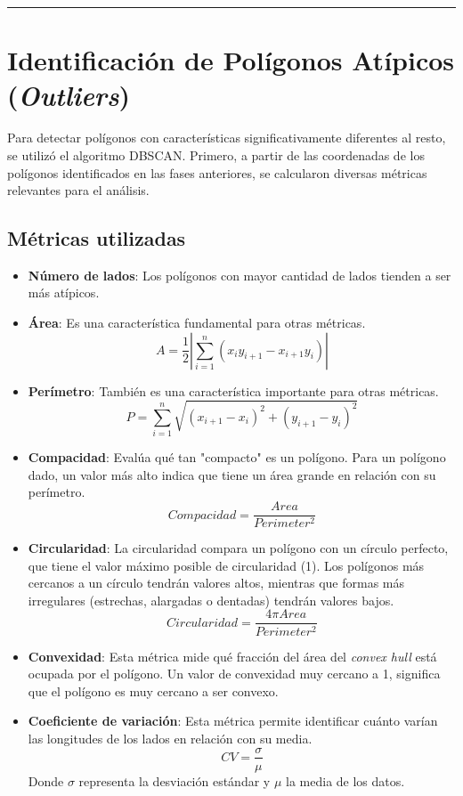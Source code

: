 \documentclass[twocolumn, fontsize=10pt]{article}
\begin{document}
\rule{\linewidth}{0.5pt}
\section{Identificación de Polígonos Atípicos (\textit{Outliers})}

Para detectar polígonos con características significativamente diferentes al resto, se utilizó el algoritmo DBSCAN. Primero, a partir de las coordenadas de los polígonos identificados en las fases anteriores, se calcularon diversas métricas relevantes para el análisis.

\subsection{Métricas utilizadas}

\begin{itemize}
    \item \textbf{Número de lados}: Los polígonos con mayor cantidad de lados tienden a ser más atípicos.
    \item \textbf{Área}: Es una característica fundamental para otras métricas.
    \[A = \frac{1}{2} \left| \sum_{i=1}^{n} \left( x_i y_{i+1} - x_{i+1} y_i \right) \right|\] \cite{area}
    \item \textbf{Perímetro}: También es una característica importante para otras métricas.
    \[P = \sum_{i=1}^{n} \sqrt{(x_{i+1} - x_i)^2 + (y_{i+1} - y_i)^2}\]
    \item \textbf{Compacidad}: Evalúa qué tan "compacto" es un polígono. Para un polígono dado, un valor más alto indica que tiene un área grande en relación con su perímetro.
    \[Compacidad = \frac{Area}{Perimeter^2} \]
    \item \textbf{Circularidad}: La circularidad compara un polígono con un círculo perfecto, que tiene el valor máximo posible de circularidad (1). Los polígonos más cercanos a un círculo tendrán valores altos, mientras que formas más irregulares (estrechas, alargadas o dentadas) tendrán valores bajos.
    \[Circularidad = \frac{4 \pi Area}{Perimeter^2}\]
    \item \textbf{Convexidad}: Esta métrica mide qué fracción del área del \textit{convex hull} está ocupada por el polígono. Un valor de convexidad muy cercano a 1, significa que el polígono es muy cercano a ser convexo.
    \item \textbf{Coeficiente de variación}: Esta métrica permite identificar cuánto varían las longitudes de los lados en relación con su media.
    \[CV = \frac{\sigma}{\mu}\]
    Donde \(\sigma\) representa la desviación estándar y  \(\mu\) la media de los datos.
\end{itemize}
\end{document}
